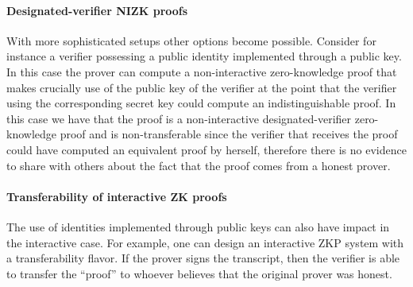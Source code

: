 \paragraph{Designated-verifier NIZK proofs}
With more sophisticated setups other options become possible. 
Consider for instance a verifier possessing a public identity implemented through a public key. 
In this case the prover can compute a non-interactive zero-knowledge proof that makes crucially use of the public key of the verifier at the point that the verifier using the corresponding secret key could compute an indistinguishable proof. 
In this case we have that the proof is a non-interactive designated-verifier zero-knowledge proof and is non-transferable since the verifier that receives the proof could have computed an equivalent proof by herself, therefore there is no evidence to share with others about the fact that the proof comes from a honest prover. 


\paragraph{Transferability of interactive ZK proofs}
The use of identities implemented through public keys can also have impact in the interactive case. 
For example, one can design an interactive ZKP system with a transferability flavor. 
If the prover signs the transcript, then the verifier is able to transfer the ``proof'' to whoever believes that the original prover was honest.
